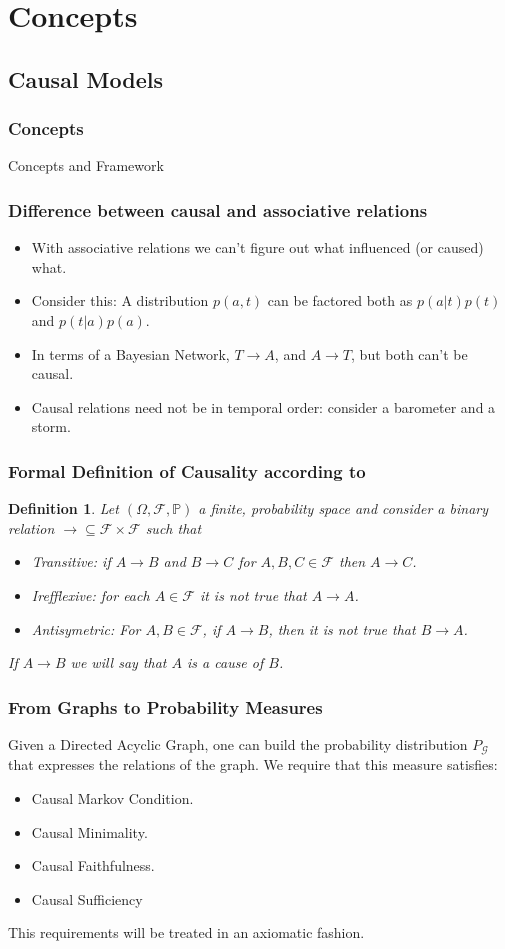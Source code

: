 \documentclass{beamer}
\theoremstyle{plain}
\newtheorem{defi}[teo]{Definition}
\begin{document}
\section{Concepts}
\subsection{Causal Models}
\begin{frame}
\frametitle{Concepts}
Concepts and Framework
\end{frame}
		\begin{frame}
		\frametitle{Difference between causal and associative relations}
		\begin{itemize}
		\item With associative relations we can't figure out what influenced (or caused) what.
		\item Consider this: A distribution $p(a,t)$ can be factored both as $p(a|t)p(t)$ and $p(t|a)p(a)$. 
		\item In terms of a Bayesian Network, $T \to A$, and $A \to T$, but both can't be causal.
		\item Causal relations need not be in temporal order: consider a barometer and a storm.
		\end{itemize}
		\end{frame}
		
		\begin{frame}
		\frametitle{Formal Definition of Causality according to \cite{spirtes2000causation}}
		\begin{defi}
		Let $(\Omega, \mathcal{F}, \mathbb{P})$ a finite, probability space and consider a binary relation  $\to  \subseteq \mathcal{F} \times \mathcal{F}$ such that
		\begin{itemize}
		\item Transitive: if $A \to B$ and $B \to C$ for $A,B,C \in \mathcal{F}$ then $A \to C$.
		\item  Irefflexive: for each $A \in \mathcal{F}$ it is not true that $A \to A$.
		\item Antisymetric: For $A, B \in \mathcal{F}$, if $A \to B$, then it is not true that $B \to A$.
		\end{itemize}
		If $A \to B$ we will say that $A$ is a cause of $B$.
		\end{defi}
		\end{frame}
		
		\begin{frame}
		\frametitle{From Graphs to Probability Measures}
		Given a Directed Acyclic Graph, one can build the probability distribution $P_\mathcal{G}$ that expresses the relations of the graph. We require that this measure satisfies:
        \begin{itemize}
        \item Causal Markov Condition.
        \item Causal Minimality.
         \item Causal Faithfulness.
         \item Causal Sufficiency
        \end{itemize}
         This requirements will be treated in an axiomatic fashion.
		\end{frame}
		
\end{document}
